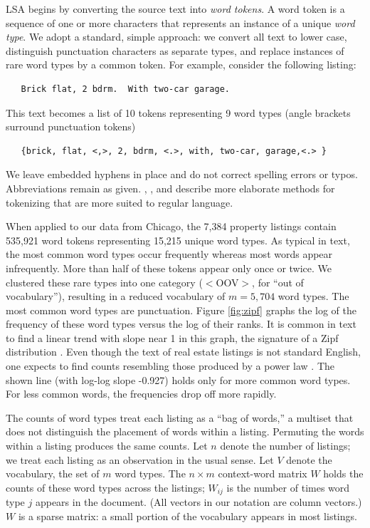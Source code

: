 \documentclass[12pt]{article}
\begin{document}
 LSA begins by converting the source text into {\em word tokens}.  A word token
 is a sequence of one or more characters that represents an instance of a unique
 {\em word type}.  We adopt a standard, simple approach: we convert all text to
 lower case, distinguish punctuation characters as separate types, and replace
 instances of rare word types by a common token. For example, consider the
 following listing:
 \begin{verbatim}
   Brick flat, 2 bdrm.  With two-car garage. 
 \end{verbatim} 
 \noindent
 This text becomes a list of 10 tokens representing 9 word types (angle brackets
 surround punctuation tokens)
 \begin{verbatim}
   {brick, flat, <,>, 2, bdrm, <.>, with, two-car, garage,<.> } 
 \end{verbatim} 
 \noindent
 We leave embedded hyphens in place and do not correct spelling errors or typos.
  Abbreviations remain as given.  \citet{manning99}, \citet{jurafsky09}, and
 \citet{turney10} describe more elaborate methods for tokenizing that are more
 suited to regular language.

  
 When applied to our data from Chicago, the 7,384 property listings contain
 535,921 word tokens representing 15,215 unique word types.  As typical in text,
 the most common word types occur frequently whereas most words appear
 infrequently.  More than half of these tokens appear only once or twice.  We
 clustered these rare types into one category ($<$OOV$>$, for ``out of
 vocabulary''), resulting in a reduced vocabulary of $m = 5,704$ word types.
  The most common word types are punctuation.  Figure \ref{fig:zipf} graphs the
 log of the frequency of these word types versus the log of their ranks.  It is
 common in text to find a linear trend with slope near 1 in this graph, the
 signature of a Zipf distribution \citep{zipf35, baayen02}.  Even though the
 text of real estate listings is not standard English, one expects to find
 counts resembling those produced by a power law \citep{clauset09}.  The shown
 line (with log-log slope -0.927) holds only for more common word types.  For
 less common words, the frequencies drop off more rapidly.

 The counts of word types treat each listing as a ``bag of words,'' a multiset
 that does not distinguish the placement of words within a listing.  Permuting
 the words within a listing produces the same counts.  Let $n$ denote the number
 of listings; we treat each listing as an observation in the usual sense.  Let
 $V$ denote the vocabulary, the set of $m$ word types.  The $n \times m$
 context-word matrix $W$ holds the counts of these word types across the
 listings; $W_{ij}$ is the number of times word type $j$ appears in the \ith
 document.  (All vectors in our notation are column vectors.)  $W$ is a sparse
 matrix: a small portion of the vocabulary appears in most listings.  
\end{document}
